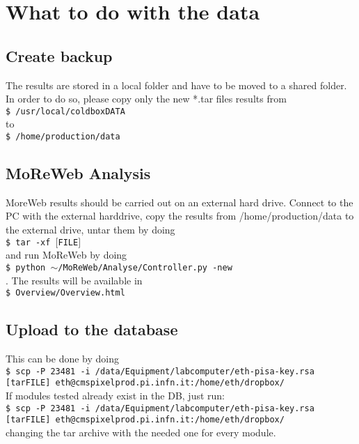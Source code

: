 \documentclass[fleqn,10pt]{SelfArx} %
\newcommand{\shellcmd}[1]{\\\indent\indent\texttt{\footnotesize\$ #1}\\}
\begin{document}
\section{What to do with the data}
\subsection{Create backup}
The results are stored in a local folder and have to be moved to a shared folder. In order to do so, please copy only the new *.tar files results from 
\shellcmd{/usr/local/coldboxDATA} 
to
\shellcmd{/home/production/data}

\subsection{MoReWeb Analysis}
MoreWeb results should be carried out on an external hard drive. Connect to the PC with the external harddrive, copy the results from /home/production/data to the external drive, untar them by doing 
\shellcmd{tar -xf $[$FILE$]$}
and run MoReWeb by doing 
\shellcmd{python $\sim$/MoReWeb/Analyse/Controller.py -new}. 
The results will be available in 
\shellcmd {Overview/Overview.html}

\subsection{Upload to the database}
This can be done by doing 
\shellcmd{scp -P 23481 -i /data/Equipment/labcomputer/eth-pisa-key.rsa [tarFILE] eth@cmspixelprod.pi.infn.it:/home/eth/dropbox/}

If modules tested already exist in the DB, just run:
\shellcmd{scp -P 23481 -i /data/Equipment/labcomputer/eth-pisa-key.rsa [tarFILE] eth@cmspixelprod.pi.infn.it:/home/eth/dropbox/}
changing the tar archive with the needed one for every module.












\end{document}
